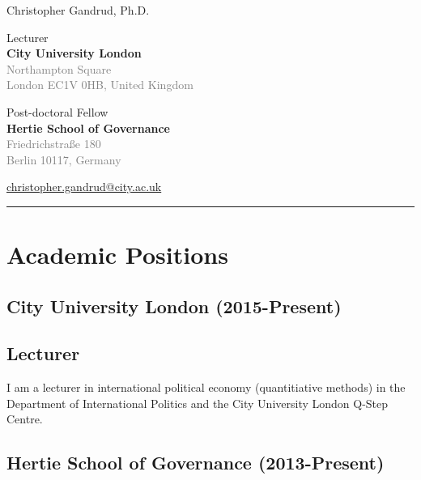 \documentclass[a4paper]{article}
\begin{document}
    \begin{flushright}
        {\huge{Christopher Gandrud, Ph.D.}} \\
        \vspace{0.25cm}

        Lecturer \\
        {\bf{\large{City University London}}} \\
        \textcolor{gray}{Northampton Square \\
        London EC1V 0HB, United Kingdom} \\
        \vspace{0.25cm}

        Post-doctoral Fellow \\
        {\bf{\large{Hertie School of Governance}}} \\
        \textcolor{gray}{Friedrichstra{\ss}e 180\\
        Berlin 10117, Germany} \\
        \vspace{0.25cm}

        \href{mailto:christopher.gandrud@city.ac.uk}{christopher.gandrud@city.ac.uk}\\[0.25cm]
    \end{flushright}
\medskip\hrule height 1pt
\vspace{1cm}

\section*{Academic Positions}

\subsection*{City University London (2015-Present)}

\subsection*{Lecturer}

I am a lecturer in international political economy (quantitiative methods) in the Department of International Politics and the City University London Q-Step Centre.

\subsection*{Hertie School of Governance (2013-Present)}
\end{document}
